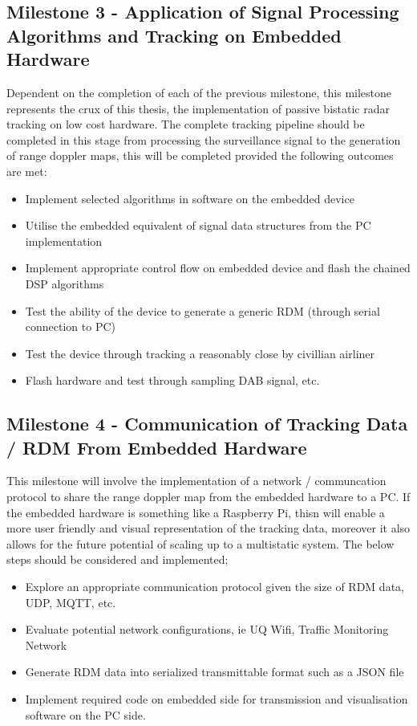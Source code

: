 \documentclass[12pt,a4paper]{article}
\begin{document}
\subsection{Milestone 3 - Application of Signal Processing Algorithms and Tracking on Embedded Hardware} 
Dependent on the completion of each of the previous milestone, this milestone represents the crux of this thesis, the implementation of passive bistatic radar tracking on low cost hardware. The complete tracking pipeline should be completed in this stage from processing the surveillance signal to the generation of range doppler maps, this will be completed provided the following outcomes are met:
\begin{multicols}{2}
    \begin{itemize}
    \item Implement selected algorithms in software on the embedded device
    \item Utilise the embedded equivalent of signal data structures from the PC implementation
    \item Implement appropriate control flow on embedded device and flash the chained DSP algorithms
    \item Test the ability of the device to generate a generic RDM (through serial connection to PC)
    \item Test the device through tracking a reasonably close by civillian airliner 
    \item Flash hardware and test through sampling DAB signal, etc. 
    \end{itemize}
\end{multicols}

\subsection{Milestone 4 - Communication of Tracking Data / RDM From Embedded Hardware} 
This milestone will involve the implementation of a network / communcation protocol to share the range doppler map from the embedded hardware to a PC. If the embedded hardware is something like a Raspberry Pi, thisn will enable a more user friendly and visual representation of the tracking data, moreover it also allows for the future potential of scaling up to a multistatic system. The below steps should be considered and implemented;
\begin{multicols}{2}
    \begin{itemize}
    \item Explore an appropriate communication protocol given the size of RDM data, UDP, MQTT, etc.
    \item Evaluate potential network configurations, ie UQ Wifi, Traffic Monitoring Network
    \item Generate RDM data into serialized transmittable format such as a JSON file
    \item Implement required code on embedded side for transmission and visualisation software on the PC side.
    \end{itemize} 
\end{multicols}
\end{document}
